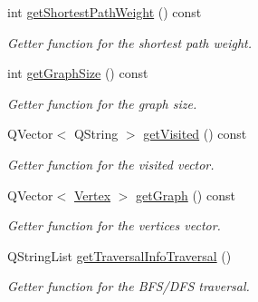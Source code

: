 \begin{DoxyCompactItemize}
int \hyperlink{class_graph_a63c083974789c0b7259339c574901228}{get\+Shortest\+Path\+Weight} () const
\begin{DoxyCompactList}\small\item\em Getter function for the shortest path weight. \end{DoxyCompactList}\item 
int \hyperlink{class_graph_af3da8365315d5435f490d48081cd5e42}{get\+Graph\+Size} () const
\begin{DoxyCompactList}\small\item\em Getter function for the graph size. \end{DoxyCompactList}\item 
Q\+Vector$<$ Q\+String $>$ \hyperlink{class_graph_a92dd89f52ca03428afe90a3ee99ece1e}{get\+Visited} () const
\begin{DoxyCompactList}\small\item\em Getter function for the visited vector. \end{DoxyCompactList}\item 
Q\+Vector$<$ \hyperlink{struct_vertex}{Vertex} $>$ \hyperlink{class_graph_a803afabcf8fd3f7ede5f547f1b61cccf}{get\+Graph} () const
\begin{DoxyCompactList}\small\item\em Getter function for the vertices vector. \end{DoxyCompactList}\item 
Q\+String\+List \hyperlink{class_graph_a27674fdc8baef9afe7406f067d56137c}{get\+Traversal\+Info\+Traversal} ()
\begin{DoxyCompactList}\small\item\em Getter function for the B\+F\+S/\+D\+FS traversal. \end{DoxyCompactList}\end{DoxyCompactItemize}
